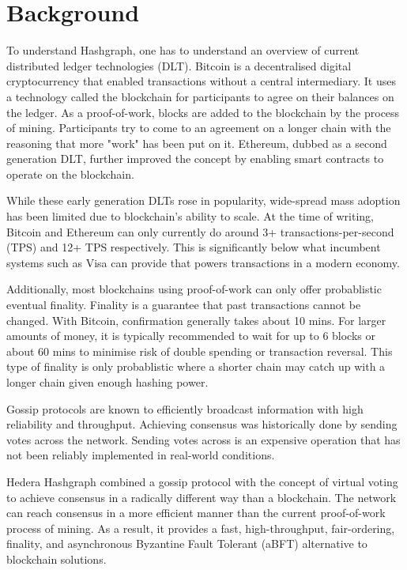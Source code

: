 \section{Background}

To understand Hashgraph, one has to understand an overview of current distributed ledger technologies (DLT). Bitcoin\cite{nakamoto2008peer} is a decentralised digital cryptocurrency that enabled transactions without a central intermediary. It uses a technology called the blockchain for participants to agree on their balances on the ledger. As a proof-of-work, blocks are added to the blockchain by the process of mining. Participants try to come to an agreement on a longer chain with the reasoning that more "work" has been put on it. Ethereum\cite{wood2014ethereum}, dubbed as a second generation DLT, further improved the concept by enabling smart contracts to operate on the blockchain.

While these early generation DLTs rose in popularity, wide-spread mass adoption has been limited due to blockchain's ability to scale. At the time of writing, Bitcoin and Ethereum can only currently do around 3+ transactions-per-second (TPS)\cite{bitcointps} and 12+ TPS respectively\cite{ethereumtps}. This is significantly below what incumbent systems such as Visa can provide\cite{visafactsheet} that powers transactions in a modern economy.

Additionally, most blockchains using proof-of-work can only offer probablistic eventual finality\cite{anceaume2020finality}. Finality is a guarantee that past transactions cannot be changed. With Bitcoin, confirmation generally takes about 10 mins. For larger amounts of money, it is typically recommended to wait for up to 6 blocks or about 60 mins to minimise risk of double spending or transaction reversal\cite{coinmarketconfirm}. This type of finality is only probablistic where a shorter chain may catch up with a longer chain given enough hashing power.

Gossip protocols are known to efficiently broadcast information with high reliability and throughput\cite{birman}. Achieving consensus was historically done by sending votes across the network\cite{berman1989towards}. Sending votes across is an expensive operation that has not been reliably implemented in real-world conditions.

Hedera Hashgraph\cite{baird2016} combined a gossip protocol with the concept of virtual voting to achieve consensus in a radically different way than a blockchain. The network can reach consensus in a more efficient manner than the current proof-of-work process of mining. As a result, it provides a fast, high-throughput, fair-ordering, finality, and asynchronous Byzantine Fault Tolerant (aBFT) alternative to blockchain solutions.
